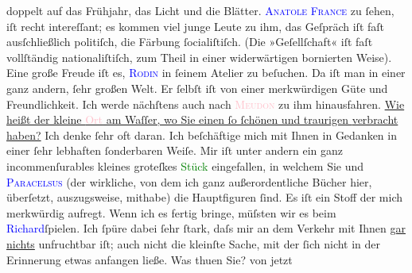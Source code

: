                doppelt auf das Frühjahr, das Licht und die Blätter.\pend
           \pstart
           \textcolor{blue}{\textsc{Anatole France}}{}\ledrightnote{\textcolor{blue}{Anatole France}} zu ſehen, iſt recht intereſſant; es kommen {\pb}viel junge Leute zu ihm, das
               Geſpräch iſt faſt ausſchließlich politiſch, die Färbung ſocialiſtiſch. (Die
               »Geſellſchaft« iſt faſt vollſtändig nationaliſtiſch, zum Theil in einer widerwärtigen
               bornierten Weise).\pend
           \pstart
           Eine große Freude iſt es, \textcolor{blue}{\textsc{Rodin}}{}\ledrightnote{\textcolor{blue}{Auguste Rodin}} in ſeinem Atelier zu beſuchen. Da iſt man in einer ganz andern, ſehr großen
               Welt. Er ſelbſt iſt von einer merkwürdigen Güte und Freundlichkeit. Ich {\pb}werde  nächſtens auch nach \textcolor{pink}{\textsc{Meudon}}{}\ledrightnote{\textcolor{pink}{Meudon}} zu ihm hinausfahren.\pend
           \pstart
           \uline{Wie heißt der kleine \textcolor{pink}{Ort}{} am Waſſer, wo Sie einen ſo ſchönen und traurigen
                     \label{K_L01021_1v}\label{K_L01021_1h} verbracht haben?} Ich denke ſehr oft daran.\pend
           \pstart
           Ich beſchäftige mich mit Ihnen in Gedanken in einer ſehr lebhaften ſonderbaren Weiſe.
               Mir iſt unter andern ein ganz incommenſurables kleines groteſkes \textcolor{green}{Stück}{} eingefallen, in welchem Sie und \textcolor{blue}{\textsc{Paracelsus}}{}\ledrightnote{\textcolor{blue}{Theofrastus Bombastus Paracelsus}} (der wirkliche, von dem ich ganz {\pb}außerordentliche Bücher hier,
               überſetzt, auszugsweise, mithabe) die Hauptfiguren ſind. Es iſt ein Stoff der mich
               merkwürdig aufregt. Wenn ich es fertig bringe, müſsten wir es beim \textcolor{blue}{Richard}{}\ledrightnote{\textcolor{blue}{Richard Beer-Hofmann}}{ }ſpielen. Ich ſpüre dabei ſehr ſtark, daſs mir an
               dem Verkehr mit Ihnen \uline{gar}{ }\uline{nichts} unfruchtbar iſt; auch nicht die kleinſte
               Sache, mit der ſich nicht in der {\pb}Erinnerung etwas anfangen ließe.\pend
           \pstart
           Was thuen Sie? von \label{K_L01021_2v}\label{K_L01021_2h} jetzt
